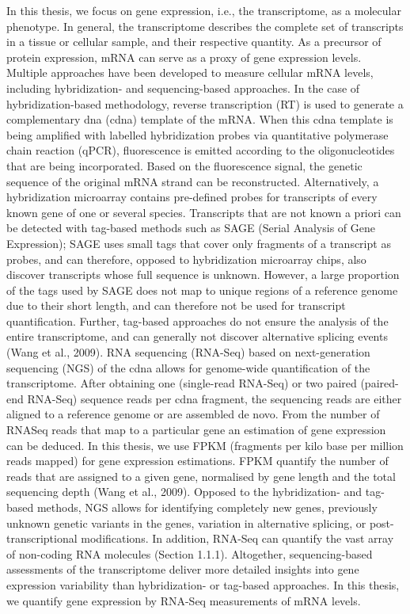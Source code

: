 In this thesis, we focus on gene expression, i.e., the transcriptome, as a molecular phenotype.
In general, the transcriptome describes the complete set of transcripts in a tissue or cellular sample, and their respective quantity. 
As a precursor of protein expression, mRNA can serve as a proxy of gene expression levels. 
Multiple approaches have been developed to measure cellular mRNA levels, including hybridization- and sequencing-based approaches. 
In the case of hybridization-based methodology, reverse transcription (RT) is used to generate a complementary \gls{dna} (c\gls{dna}) template of the mRNA. 
When this c\gls{dna} template is being amplified with labelled hybridization probes via quantitative polymerase chain reaction (qPCR), fluorescence is emitted according to the oligonucleotides that are being incorporated. 
Based on the fluorescence signal, the genetic sequence of the original mRNA strand can be reconstructed. 
Alternatively, a hybridization microarray contains pre-defined probes for transcripts of every known gene of one or several species. Transcripts that are not known a priori can be detected with tag-based methods such as SAGE (Serial Analysis of Gene Expression); SAGE uses small tags that cover only fragments of a transcript as probes, and can therefore, opposed to hybridization microarray chips, also discover transcripts whose full sequence is unknown. 
However, a large proportion of the tags used by SAGE does not map to unique regions of a reference genome due to their short length, and can therefore not be used for transcript quantification. 
Further, tag-based approaches do not ensure the analysis of the entire transcriptome, and can generally not discover alternative splicing events (Wang et al., 2009).
RNA sequencing (RNA-Seq) based on next-generation sequencing (NGS) of the c\gls{dna} allows for genome-wide quantification of the transcriptome. After obtaining one (single-read RNA-Seq) or two paired (paired-end RNA-Seq) sequence reads per c\gls{dna} fragment, the sequencing reads are either aligned to a reference genome or are assembled de novo. 
From the number of RNASeq reads that map to a particular gene an estimation of gene expression can be deduced. 
In this thesis, we use FPKM (fragments per kilo base per million reads mapped) for gene expression estimations. 
FPKM quantify the number of reads that are assigned to a given gene, normalised by gene length and the total sequencing depth (Wang et al., 2009).
Opposed to the hybridization- and tag-based methods, NGS allows for identifying completely new genes, previously unknown genetic variants in the genes, variation in alternative splicing, or post-transcriptional modifications. In addition, RNA-Seq can quantify the vast array of non-coding RNA molecules (Section 1.1.1). Altogether, sequencing-based assessments of the transcriptome deliver more detailed insights into gene expression variability than hybridization- or tag-based approaches.
In this thesis, we quantify gene expression by RNA-Seq measurements of mRNA levels.

